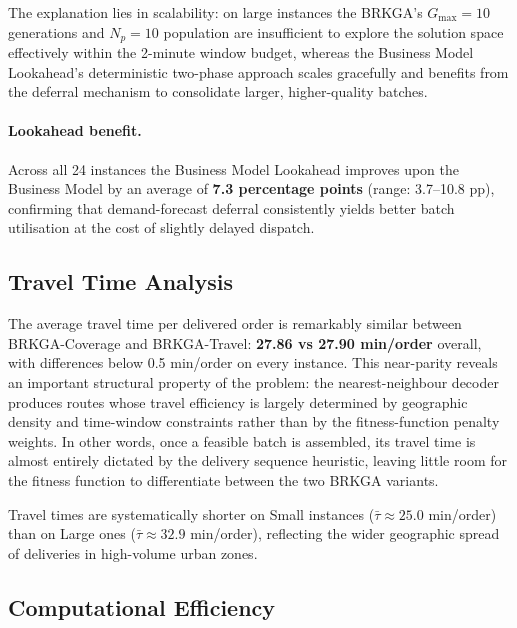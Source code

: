 The explanation lies in scalability:
on large instances the BRKGA's $G_{\max} = 10$ generations and
$N_p = 10$ population are insufficient to explore the solution
space effectively within the 2-minute window budget,
whereas the Business Model Lookahead's deterministic two-phase
approach scales gracefully and benefits from the deferral
mechanism to consolidate larger, higher-quality batches.

\paragraph{Lookahead benefit.}
Across all 24 instances the Business Model Lookahead improves
upon the Business Model by an average of \textbf{7.3 percentage
points} (range: 3.7--10.8 pp), confirming that demand-forecast
deferral consistently yields better batch utilisation at the
cost of slightly delayed dispatch.

\subsection{Travel Time Analysis}\label{subsec:travel_analysis}

The average travel time per delivered order is remarkably similar
between BRKGA-Coverage and BRKGA-Travel: \textbf{27.86 vs
27.90 min/order} overall, with differences below 0.5 min/order
on every instance.
This near-parity reveals an important structural property
of the problem: the nearest-neighbour decoder produces routes
whose travel efficiency is largely determined by geographic
density and time-window constraints rather than by the
fitness-function penalty weights.
In other words, once a feasible batch is assembled, its
travel time is almost entirely dictated by the delivery
sequence heuristic, leaving little room for the fitness function
to differentiate between the two BRKGA variants.

Travel times are systematically shorter on Small instances
($\bar{\tau} \approx 25.0$ min/order) than on Large ones
($\bar{\tau} \approx 32.9$ min/order), reflecting the wider
geographic spread of deliveries in high-volume urban zones.

\subsection{Computational Efficiency}\label{subsec:time_analysis}

